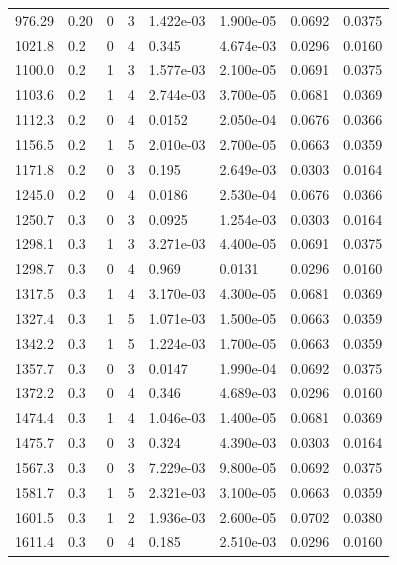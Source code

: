 \documentclass[preview]{standalone}
\begin{document}
{{{\begin{tabular}{L{1.2cm}C{1.2cm} C{0.3cm}C{0.5cm} C{1.4cm}C{1.4cm} C{1.4cm}C{1.4cm}}
  976.29  &  0.20  & 0     &  3 &  1.422e-03  & 1.900e-05  & 0.0692 &  0.0375   \\ 
  1021.8  &   0.2  & 0     &  4 &  0.345  & 4.674e-03  & 0.0296 &  0.0160   \\ 
  1100.0  &   0.2  & 1     &  3 &  1.577e-03  & 2.100e-05  & 0.0691 &  0.0375   \\ 
  1103.6  &   0.2  & 1     &  4 &  2.744e-03  & 3.700e-05  & 0.0681 &  0.0369   \\ 
  1112.3  &   0.2  & 0     &  4 &  0.0152  & 2.050e-04  & 0.0676 &  0.0366   \\ 
  1156.5  &   0.2  & 1     &  5 &  2.010e-03  & 2.700e-05  & 0.0663 &  0.0359   \\ 
  1171.8  &   0.2  & 0     &  3 &  0.195  & 2.649e-03  & 0.0303 &  0.0164   \\ 
  1245.0  &   0.2  & 0     &  4 &  0.0186  & 2.530e-04  & 0.0676 &  0.0366   \\ 
  1250.7  &   0.3  & 0     &  3 &  0.0925  & 1.254e-03  & 0.0303 &  0.0164   \\ 
  1298.1  &   0.3  & 1     &  3 &  3.271e-03  & 4.400e-05  & 0.0691 &  0.0375   \\ 
  1298.7  &   0.3  & 0     &  4 &  0.969  & 0.0131  & 0.0296 &  0.0160   \\ 
  1317.5  &   0.3  & 1     &  4 &  3.170e-03  & 4.300e-05  & 0.0681 &  0.0369   \\ 
  1327.4  &   0.3  & 1     &  5 &  1.071e-03  & 1.500e-05  & 0.0663 &  0.0359   \\ 
  1342.2  &   0.3  & 1     &  5 &  1.224e-03  & 1.700e-05  & 0.0663 &  0.0359   \\ 
  1357.7  &   0.3  & 0     &  3 &  0.0147  & 1.990e-04  & 0.0692 &  0.0375   \\ 
  1372.2  &   0.3  & 0     &  4 &  0.346  & 4.689e-03  & 0.0296 &  0.0160   \\ 
  1474.4  &   0.3  & 1     &  4 &  1.046e-03  & 1.400e-05  & 0.0681 &  0.0369   \\ 
  1475.7  &   0.3  & 0     &  3 &  0.324  & 4.390e-03  & 0.0303 &  0.0164   \\ 
  1567.3  &   0.3  & 0     &  3 &  7.229e-03  & 9.800e-05  & 0.0692 &  0.0375   \\ 
  1581.7  &   0.3  & 1     &  5 &  2.321e-03  & 3.100e-05  & 0.0663 &  0.0359   \\ 
  1601.5  &   0.3  & 1     &  2 &  1.936e-03  & 2.600e-05  & 0.0702 &  0.0380   \\ 
  1611.4  &   0.3  & 0     &  4 &  0.185  & 2.510e-03  & 0.0296 &  0.0160   \\ 

\end{tabular}}}}
\end{document}
